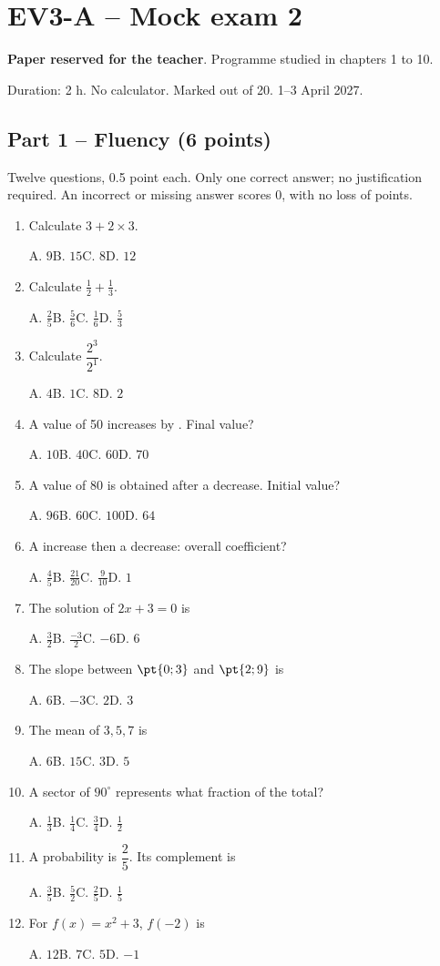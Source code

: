 \mxnewpage\section*{EV3-A -- Mock exam 2}\label{EV3-A}
\textbf{Paper reserved for the teacher}. Programme studied in chapters 1 to 10.\par Duration: 2 h. No calculator. Marked out of 20. 1--3 April 2027.
\subsection*{Part 1 -- Fluency (6 points)}
Twelve questions, \num{0,5} point each. Only one correct answer; no justification required. An incorrect or missing answer scores 0, with no loss of points.
\begin{enumerate}
\item Calculate $3+2\times3$.\par A. $9$\quad B. $15$\quad C. $8$\quad D. $12$
\item Calculate $\frac12+\frac13$.\par A. $\frac{2}{5}$\quad B. $\frac{5}{6}$\quad C. $\frac{1}{6}$\quad D. $\frac{5}{3}$
\item Calculate $\dfrac{2^3}{2^{1}}$.\par A. $4$\quad B. $1$\quad C. $8$\quad D. $2$
\item A value of 50 increases by . Final value?\par A. $10$\quad B. $40$\quad C. $60$\quad D. $70$
\item A value of 80 is obtained after a  decrease. Initial value?\par A. $96$\quad B. $60$\quad C. $100$\quad D. $64$
\item A  increase then a  decrease: overall coefficient?\par A. $\frac{4}{5}$\quad B. $\frac{21}{20}$\quad C. $\frac{9}{10}$\quad D. $1$
\item The solution of $2x+3=0$ is\par A. $\frac{3}{2}$\quad B. $\frac{-3}{2}$\quad C. $-6$\quad D. $6$
\item The slope between $\pt{0;3}$ and $\pt{2;9}$ is\par A. $6$\quad B. $-3$\quad C. $2$\quad D. $3$
\item The mean of $3, 5, 7$ is\par A. $6$\quad B. $15$\quad C. $3$\quad D. $5$
\item A sector of $90^\circ$ represents what fraction of the total?\par A. $\frac{1}{3}$\quad B. $\frac{1}{4}$\quad C. $\frac{3}{4}$\quad D. $\frac{1}{2}$
\item A probability is $\dfrac{2}{5}$. Its complement is\par A. $\frac{3}{5}$\quad B. $\frac{5}{2}$\quad C. $\frac{2}{5}$\quad D. $\frac{1}{5}$
\item For $f(x)=x^2+3$, $f(-2)$ is\par A. $12$\quad B. $7$\quad C. $5$\quad D. $-1$
\end{enumerate}
